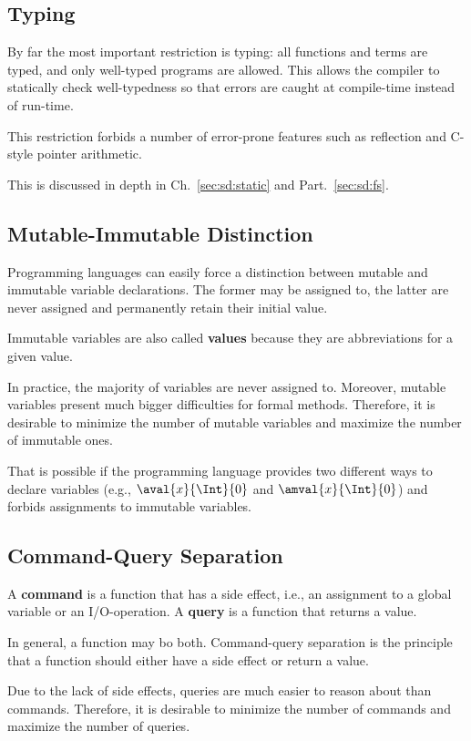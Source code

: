 \subsection{Typing}

By far the most important restriction is typing: all functions and terms are typed, and only well-typed programs are allowed.
This allows the compiler to statically check well-typedness so that errors are caught at compile-time instead of run-time.

This restriction forbids a number of error-prone features such as reflection and C-style pointer arithmetic.

This is discussed in depth in Ch.~\ref{sec:sd:static} and Part.~\ref{sec:sd:fs}.

\subsection{Mutable-Immutable Distinction}

Programming languages can easily force a distinction between mutable and immutable variable declarations.
The former may be assigned to, the latter are never assigned and permanently retain their initial value.

Immutable variables are also called \textbf{values} because they are abbreviations for a given value.

In practice, the majority of variables are never assigned to.
Moreover, mutable variables present much bigger difficulties for formal methods.
Therefore, it is desirable to minimize the number of mutable variables and maximize the number of immutable ones.

That is possible if the programming language provides two different ways to declare variables (e.g., $\aval{x}{\Int}{0}$ and $\amval{x}{\Int}{0}$) and forbids assignments to immutable variables.

\subsection{Command-Query Separation}

A \textbf{command} is a function that has a side effect, i.e., an assignment to a global variable or an I/O-operation.
A \textbf{query} is a function that returns a value.

In general, a function may bo both.
Command-query separation is the principle that a function should either have a side effect or return a value.

Due to the lack of side effects, queries are much easier to reason about than commands.
Therefore, it is desirable to minimize the number of commands and maximize the number of queries.

